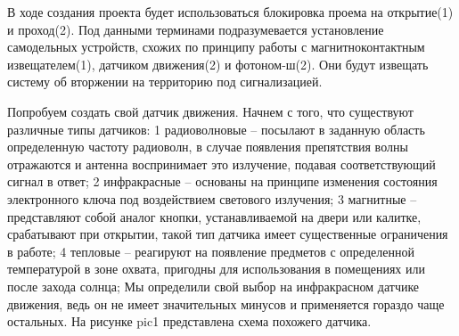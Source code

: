 В ходе создания проекта будет использоваться блокировка проема на открытие(1) и проход(2). Под данными терминами подразумевается установление 
самодельных устройств, схожих по принципу работы с магнитноконтактным извещателем(1), датчиком движения(2) и фотоном-ш(2). Они будут извещать 
систему об вторжении на территорию под сигнализацией. 

Попробуем создать свой датчик движения. Начнем с того, что существуют различные типы датчиков:
1 радиоволновые – посылают в заданную область определенную частоту радиоволн, в случае появления препятствия волны отражаются и антенна воспринимает 
это излучение, подавая соответствующий сигнал в ответ;
2 инфракрасные – основаны на принципе изменения состояния электронного ключа под воздействием светового излучения;
3 магнитные – представляют собой аналог кнопки, устанавливаемой на двери или калитке, срабатывают при открытии, такой тип датчика имеет существенные 
ограничения в работе;
4 тепловые – реагируют на появление предметов с определенной температурой в зоне охвата, пригодны для использования в помещениях или после захода солнца;
Мы определили свой выбор на инфракрасном датчике движения, ведь он не имеет значительных минусов и применяется гораздо чаще остальных. 
На рисунке pic1 представлена схема похожего датчика.
